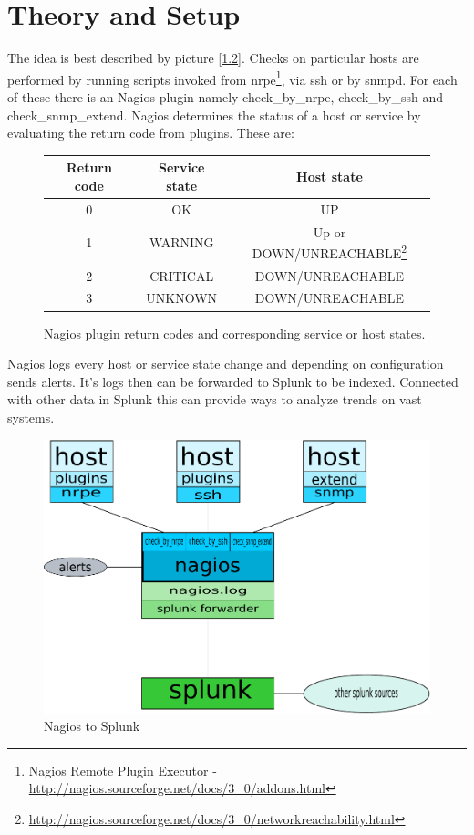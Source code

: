 \documentclass[10pt,a4paper,final]{report}
\begin{document}
\chapter{Theory and Setup}
The idea is best described by picture [\ref{NtS}]. Checks on particular hosts are performed by running scripts invoked from nrpe\footnote{Nagios Remote Plugin Executor - \url{http://nagios.sourceforge.net/docs/3\_0/addons.html}}, via ssh or by snmpd. For each of these there is an Nagios plugin namely check\_by\_nrpe, check\_by\_ssh and check\_snmp\_extend. Nagios determines the status of a host or service by evaluating the return code from plugins. These are:
\begin{figure}[hbpt]
\begin{center}
\begin{tabular}{|c|c|c|}
\hline Return code & Service state & Host state \\ 
\hline 0 & OK & UP \\ 
\hline 1 & WARNING & Up or DOWN/UNREACHABLE\footnote{\url{http://nagios.sourceforge.net/docs/3\_0/networkreachability.html}} \\ 
\hline 2 & CRITICAL & DOWN/UNREACHABLE \\ 
\hline 3 & UNKNOWN & DOWN/UNREACHABLE \\ 
\hline 
\end{tabular}
\end{center}
\caption{Nagios plugin return codes and corresponding service or host states.}
\label{ReturnC}
\end{figure}

Nagios logs every host or service state change and depending on configuration sends alerts. It's logs then can be forwarded to Splunk to be indexed. Connected with other data in Splunk this can provide ways to analyze trends on vast systems. 

\begin{figure}[hbpt]
\begin{center}
\includegraphics[scale=0.5]{nts.pdf}
\end{center}
\caption{Nagios to Splunk}
\label{NtS}
\end{figure}
\end{document}
